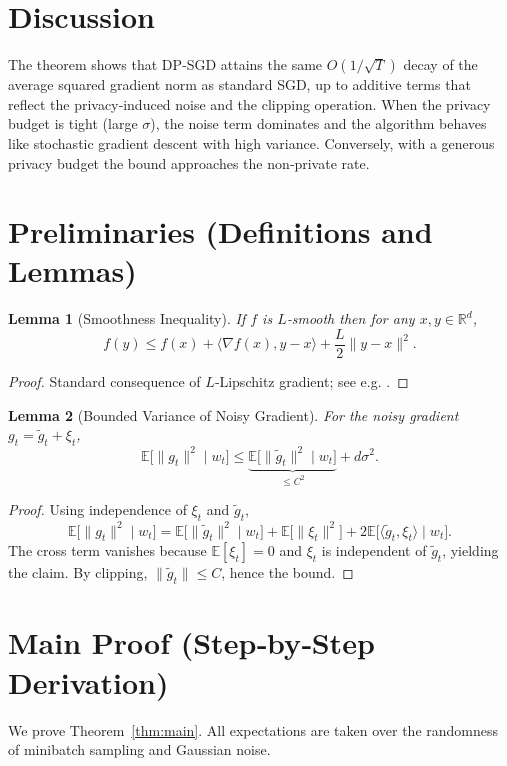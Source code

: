 \documentclass{article}
\newcommand{\E}{\mathbb{E}}
\newcommand{\R}{\mathbb{R}}
\newtheorem{lemma}{Lemma}
\begin{document}
\section*{Discussion}
The theorem shows that DP‑SGD attains the same $O(1/\sqrt{T})$ decay of the average squared gradient norm as standard SGD, up to additive terms that reflect the privacy‑induced noise and the clipping operation. When the privacy budget is tight (large $\sigma$), the noise term dominates and the algorithm behaves like stochastic gradient descent with high variance. Conversely, with a generous privacy budget the bound approaches the non‑private rate.

\newpage
\section*{Preliminaries (Definitions and Lemmas)}
\begin{lemma}[Smoothness Inequality]\label{lem:smooth}
If $f$ is $L$‑smooth then for any $x,y\in\R^{d}$,
\[
f(y)\le f(x)+\langle\nabla f(x),y-x\rangle+\frac{L}{2}\|y-x\|^{2}.
\]
\end{lemma}
\begin{proof}
Standard consequence of $L$‑Lipschitz gradient; see e.g. \cite{Nesterov2004}.
\end{proof}

\begin{lemma}[Bounded Variance of Noisy Gradient]\label{lem:variance}
For the noisy gradient $g_t=\tilde g_t+\xi_t$,
\[
\E\!\bigl[\|g_t\|^{2}\mid w_t\bigr]\le \underbrace{\E\!\bigl[\|\tilde g_t\|^{2}\mid w_t\bigr]}_{\le C^{2}}+d\sigma^{2}.
\]
\end{lemma}
\begin{proof}
Using independence of $\xi_t$ and $\tilde g_t$,
\[
\E\!\bigl[\|g_t\|^{2}\mid w_t\bigr]
 =\E\!\bigl[\|\tilde g_t\|^{2}\mid w_t\bigr]
   +\E\!\bigl[\|\xi_t\|^{2}\bigr]
   +2\E\!\bigl[\langle\tilde g_t,\xi_t\rangle\mid w_t\bigr].
\]
The cross term vanishes because $\E[\xi_t]=0$ and $\xi_t$ is independent of $\tilde g_t$, yielding the claim. By clipping, $\|\tilde g_t\|\le C$, hence the bound.
\end{proof}

\section*{Main Proof (Step‑by‑Step Derivation)}
We prove Theorem~\ref{thm:main}. All expectations are taken over the randomness of minibatch sampling and Gaussian noise.
\end{document}
